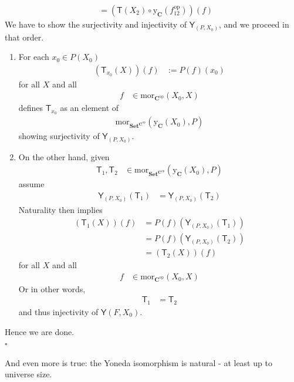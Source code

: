 \begin{prf}
\begin{align*}
  &=
  \left(
    \mathsf{T}(X_{2})
    \circ
    \mathrm{y}_{\mathbf{C}}(f_{12}^{\textrm{op}})
  \right)
  (f)
\end{align*}
We have to show the surjectivity and injectivity of $\mathsf{Y}_{(P,X_{0})}$, and we proceed in that order.
\begin{enumerate}
\item[(1)]
For each $x_{0} \in P(X_{0})$
\begin{align*}
  (\mathsf{T}_{x_{0}}(X))(f)
  &:=
  P(f)(x_{0})
\end{align*}
for all $X$ and all
\begin{align*}
  f
  &\in
  \mathrm{mor}_{\mathbf{C}^{\mathrm{op}}}
  (X_{0},X)
\end{align*}
defines $\mathsf{T}_{x_{0}}$ as an element of
\begin{align*}
  \mathrm{mor}_{\mathbf{Set}^{\mathbf{C}^{\mathrm{op}}}}
  (\mathrm{y}_{\mathbf{C}}(X_{0}),P)
\end{align*}
showing surjectivity of $\mathsf{Y}_{(P,X_{0})}$.
\item[(2)]
On the other hand, given
\begin{align*}
  \mathsf{T}_{1},\mathsf{T}_{2}
  &\in
  \mathrm{mor}_{\mathbf{Set}^{\mathbf{C}^{\mathrm{op}}}}
  (\mathrm{y}_{\mathbf{C}}(X_{0}),P)
\end{align*}
assume
\begin{align*}
  \mathsf{Y}_{(P,X_{0})}(\mathsf{T}_{1})
  &=
  \mathsf{Y}_{(P,X_{0})}(\mathsf{T}_{2})
\end{align*}
Naturality then implies
\begin{align*}
  (\mathsf{T}_{1}(X))(f)
  &=
  P(f)(\mathsf{Y}_{(P,X_{0})}(\mathsf{T}_{1}))
  \tag{NT}
  \\
  &=
  P(f)(\mathsf{Y}_{(P,X_{0})}(\mathsf{T}_{2}))
  \\
  &=
  (\mathsf{T}_{2}(X))(f)
  \tag{NT}
\end{align*}
for all $X$ and all
\begin{align*}
  f
  &\in
  \mathrm{mor}_{\mathbf{C}^{\mathrm{op}}}(X_{0},X)
\end{align*}
Or in other words,
\begin{align*}
  \mathsf{T}_{1}
  &=
  \mathsf{T}_{2}
\end{align*}
and thus injectivity of $\mathsf{Y}(F,X_{0})$.
\end{enumerate}
Hence we are done.
\\
\phantom{proven}
\hfill
$\square$
\end{prf}
And even more is true: the Yoneda isomorphism is natural - at least up to universe size.
